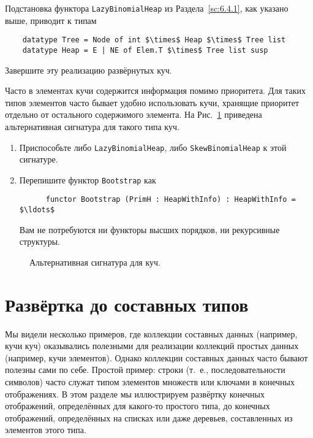 \begin{exercise}\label{ex:10.7}
  Подстановка функтора \lstinline!LazyBinomialHeap! из
  Раздела~\ref{sc:6.4.1}, как указано выше, приводит к типам
  \begin{lstlisting}
    datatype Tree = Node of int $\times$ Heap $\times$ Tree list
    datatype Heap = E | NE of Elem.T $\times$ Tree list susp
  \end{lstlisting}
  Завершите эту реализацию развёрнутых куч.
\end{exercise}

\begin{exercise}\label{ex:10.8}
  Часто в элементах кучи содержится информация помимо приоритета. Для
  таких типов элементов часто бывает удобно использовать кучи,
  хранящие приоритет отдельно от остального содержимого элемента. На
  Рис.~\ref{fig:10.8} приведена альтернативная сигнатура для такого
  типа куч.
  \begin{enumerate}
  \item Приспособьте либо \lstinline!LazyBinomialHeap!, либо
    \lstinline!SkewBinomialHeap! к этой сигнатуре.
  \item Перепишите функтор \lstinline!Bootstrap! как
    \begin{lstlisting}
      functor Bootstrap (PrimH : HeapWithInfo) : HeapWithInfo = $\ldots$
    \end{lstlisting}
    Вам не потребуются ни функторы высших порядков, ни рекурсивные
    структуры.
  \end{enumerate}
\end{exercise}

\begin{figure}
  \centering
  
  \caption{Альтернативная сигнатура для куч.}
  \label{fig:10.8}
\end{figure}

\section{Развёртка до составных типов}
\label{sc:10.3}

Мы видели несколько примеров, где коллекции составных данных
(например, кучи куч) оказывались полезными для реализации коллекций
простых данных (например, кучи элементов). Однако коллекции составных
данных часто бывают полезны сами по себе.  Простой пример: строки
(т.~е., последовательности символов) часто служат типом
элементов множеств или ключами в конечных отображениях. В этом разделе
мы иллюстрируем развёртку конечных отображений, определённых для
какого-то простого типа, до конечных отображений, определённых на
списках или даже деревьев, составленных из элементов этого типа.

